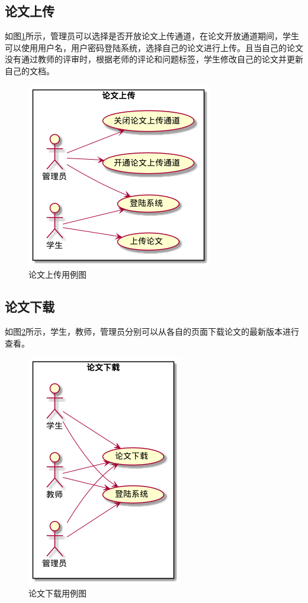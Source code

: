 \subsection{论文上传}

如图\ref{upload-usecase}所示，管理员可以选择是否开放论文上传通道，在论文开放通道期间，学生可以使用用户名，用户密码登陆系统，选择自己的论文进行上传。且当自己的论文没有通过教师的评审时，根据老师的评论和问题标签，学生修改自己的论文并更新自己的文档。

\begin{figure}[H]
    \centering
    \includegraphics[scale = 0.6]{out/uml/用例图/2-论文上传/2-论文上传.png}
    \caption{\song\wuhao 论文上传用例图}
    \label{upload-usecase}
\end{figure}

\subsection{论文下载}

如图\ref{download-usecase}所示，学生，教师，管理员分别可以从各自的页面下载论文的最新版本进行查看。

\begin{figure}[H]
    \centering
    \includegraphics[scale = 0.6]{out/uml/用例图/5-论文下载/5-论文下载.png}
    \caption{\song\wuhao 论文下载用例图}
    \label{download-usecase}
\end{figure}

